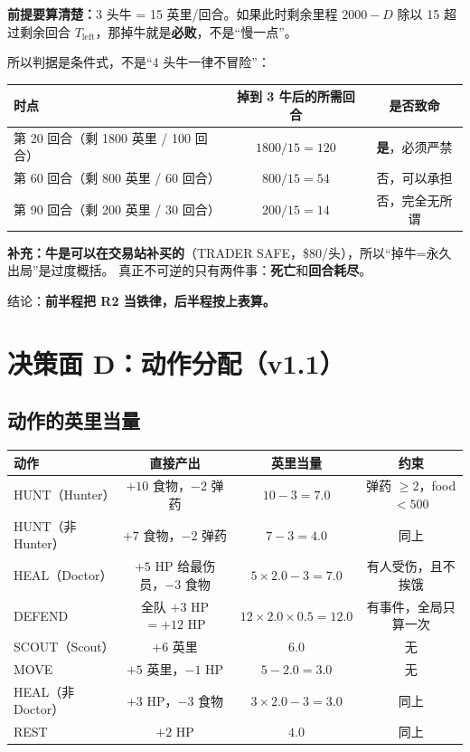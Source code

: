 \documentclass[UTF8,11pt,a4paper]{ctexart}
\begin{document}
\begin{keybox}[title={R2 是 v1.1 新增的，也是最重要的一条}]
\textbf{前提要算清楚：}3 头牛 = 15 英里/回合。如果此时剩余里程 $2000-D$ 除以 15
超过剩余回合 $T_{\text{left}}$，那掉牛就是\textbf{必败}，不是“慢一点”。

所以判据是条件式，不是“4 头牛一律不冒险”：

\begin{center}
\begin{tabular}{@{}lcc@{}}
\toprule
\textbf{时点} & \textbf{掉到 3 牛后的所需回合} & \textbf{是否致命} \\
\midrule
第 20 回合（剩 1800 英里 / 100 回合） & $1800/15=120$ & \textbf{是}，必须严禁 \\
第 60 回合（剩 800 英里 / 60 回合） & $800/15=54$ & 否，可以承担 \\
第 90 回合（剩 200 英里 / 30 回合） & $200/15=14$ & 否，完全无所谓 \\
\bottomrule
\end{tabular}
\end{center}

\textbf{补充：牛是可以在交易站补买的}（TRADER SAFE，\$80/头），所以“掉牛=永久出局”是过度概括。
真正不可逆的只有两件事：\textbf{死亡}和\textbf{回合耗尽}。

结论：\textbf{前半程把 R2 当铁律，后半程按上表算。}
\end{keybox}

\section{决策面 D：动作分配（v1.1）}

\subsection{动作的英里当量}

\begin{center}
\begin{tabular}{@{}lccc@{}}
\toprule
\textbf{动作} & \textbf{直接产出} & \textbf{英里当量} & \textbf{约束} \\
\midrule
HUNT（Hunter） & $+10$ 食物，$-2$ 弹药 & $10-3=7.0$ & 弹药 $\ge2$，food $<500$ \\
HUNT（非 Hunter） & $+7$ 食物，$-2$ 弹药 & $7-3=4.0$ & 同上 \\
HEAL（Doctor） & $+5$ HP 给最伤员，$-3$ 食物 & $5\times2.0-3=7.0$ & 有人受伤，且不挨饿 \\
DEFEND & 全队 $+3$ HP $=+12$ HP & $12\times2.0\times0.5=12.0$ & 有事件，全局只算一次 \\
SCOUT（Scout） & $+6$ 英里 & $6.0$ & 无 \\
MOVE & $+5$ 英里，$-1$ HP & $5-2.0=3.0$ & 无 \\
HEAL（非 Doctor） & $+3$ HP，$-3$ 食物 & $3\times2.0-3=3.0$ & 同上 \\
REST & $+2$ HP & $4.0$ & 同上 \\
\bottomrule
\end{tabular}
\end{center}
\end{document}
